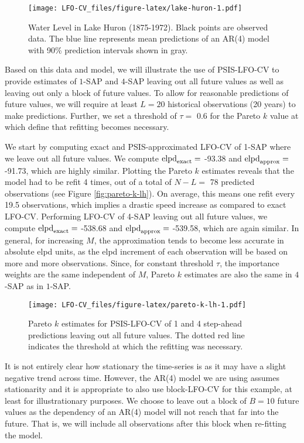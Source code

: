 \documentclass[american,]{article}
\begin{document}
\begin{figure}
\centering
\texttt{[image: LFO-CV\_files/figure-latex/lake-huron-1.pdf]}
\caption{Water Level in Lake Huron (1875-1972). Black points are
observed data. The blue line represents mean predictions of an AR(4)
model with 90\% prediction intervals shown in gray.}
\end{figure}

Based on this data and model, we will illustrate the use of PSIS-LFO-CV
to provide estimates of \(1\)-SAP and \(4\)-SAP leaving out all future
values as well as leaving out only a block of future values. To allow
for reasonable predictions of future values, we will require at least
\(L = 20\) historical observations (20 years) to make predictions.
Further, we set a threshold of \(\tau =\) 0.6 for the Pareto \(k\) value
at which define that refitting becomes necessary.

We start by computing exact and PSIS-approximated LFO-CV of 1-SAP where
we leave out all future values. We compute \({\rm elpd}_{\rm exact} =\)
-93.38 and \({\rm elpd}_{\rm approx} =\) -91.73, which are highly
similar. Plotting the Pareto \(k\) estimates reveals that the model had
to be refit 4 times, out of a total of \(N - L =\) 78 predicted
observations (see Figure \ref{fig:pareto-k-lh}). On average, this means
one refit every 19.5 observations, which implies a drastic speed
increase as compared to exact LFO-CV. Performing LFO-CV of 4-SAP leaving
out all future values, we compute \({\rm elpd}_{\rm exact} =\) -538.68
and \({\rm elpd}_{\rm approx} =\) -539.58, which are again similar. In
general, for increasing \(M\), the approximation tends to become less
accurate in absolute elpd units, as the elpd increment of each
observation will be based on more and more observations. Since, for
constant threshold \(\tau\), the importance weights are the same
independent of \(M\), Pareto \(k\) estimates are also the same in
\(4\)-SAP as in \(1\)-SAP.

\begin{figure}
\centering
\texttt{[image: LFO-CV\_files/figure-latex/pareto-k-lh-1.pdf]}
\caption{Pareto \(k\) estimates for PSIS-LFO-CV of 1 and 4 step-ahead
predictions leaving out all future values. The dotted red line indicates
the threshold at which the refitting was necessary.}
\end{figure}

It is not entirely clear how stationary the time-series is as it may
have a slight negative trend across time. However, the AR(4) model we
are using assumes stationarity and it is appropriate to also use
block-LFO-CV for this example, at least for illustrationary purposes. We
choose to leave out a block of \(B = 10\) future values as the
dependency of an AR(4) model will not reach that far into the future.
That is, we will include all observations after this block when
re-fitting the model.
\end{document}
